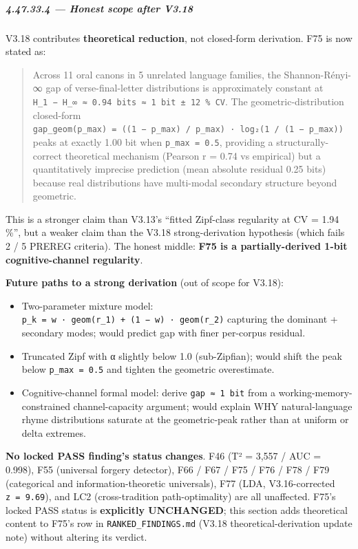 \documentclass[
]{article}
\providecommand{\tightlist}{%
  \setlength{\itemsep}{0pt}\setlength{\parskip}{0pt}}
\begin{document}
\subparagraph{4.47.33.4 --- Honest scope after
V3.18}\label{honest-scope-after-v3.18}

V3.18 contributes \textbf{theoretical reduction}, not closed-form
derivation. F75 is now stated as:

\begin{quote}
Across 11 oral canons in 5 unrelated language families, the
Shannon-Rényi-∞ gap of verse-final-letter distributions is approximately
constant at
\texttt{H\_1\ −\ H\_∞\ ≈\ 0.94\ bits\ ≈\ 1\ bit\ ±\ 12\ \%\ CV}. The
geometric-distribution closed-form
\texttt{gap\_geom(p\_max)\ =\ ((1\ −\ p\_max)\ /\ p\_max)\ ·\ log₂(1\ /\ (1\ −\ p\_max))}
peaks at exactly 1.00 bit when \texttt{p\_max\ =\ 0.5}, providing a
structurally-correct theoretical mechanism (Pearson r = 0.74 vs
empirical) but a quantitatively imprecise prediction (mean absolute
residual 0.25 bits) because real distributions have multi-modal
secondary structure beyond geometric.
\end{quote}

This is a stronger claim than V3.13's ``fitted Zipf-class regularity at
CV = 1.94 \%'', but a weaker claim than the V3.18 strong-derivation
hypothesis (which fails 2 / 5 PREREG criteria). The honest middle:
\textbf{F75 is a partially-derived 1-bit cognitive-channel regularity}.

\textbf{Future paths to a strong derivation} (out of scope for V3.18):

\begin{itemize}
\tightlist
\item
  Two-parameter mixture model:
  \texttt{p\_k\ =\ w\ ·\ geom(r\_1)\ +\ (1\ −\ w)\ ·\ geom(r\_2)}
  capturing the dominant + secondary modes; would predict gap with finer
  per-corpus residual.
\item
  Truncated Zipf with α slightly below 1.0 (sub-Zipfian); would shift
  the peak below \texttt{p\_max\ =\ 0.5} and tighten the geometric
  overestimate.
\item
  Cognitive-channel formal model: derive \texttt{gap\ ≈\ 1\ bit} from a
  working-memory-constrained channel-capacity argument; would explain
  WHY natural-language rhyme distributions saturate at the
  geometric-peak rather than at uniform or delta extremes.
\end{itemize}

\textbf{No locked PASS finding's status changes}. F46 (T² = 3,557 / AUC
= 0.998), F55 (universal forgery detector), F66 / F67 / F75 / F76 / F78
/ F79 (categorical and information-theoretic universals), F77 (LDA,
V3.16-corrected \texttt{\textbar{}z\textbar{}\ =\ 9.69}), and LC2
(cross-tradition path-optimality) are all unaffected. F75's locked PASS
status is \textbf{explicitly UNCHANGED}; this section adds theoretical
content to F75's row in \texttt{RANKED\_FINDINGS.md} (V3.18
theoretical-derivation update note) without altering its verdict.
\end{document}
